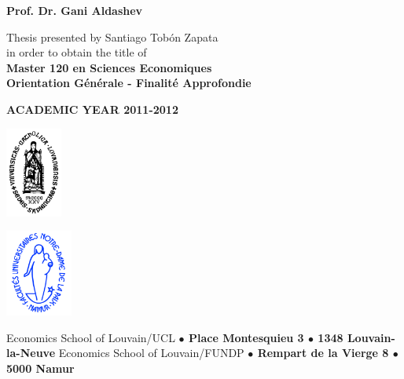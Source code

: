 \documentclass[a4paper, 12pt]{article}
\begin{document}
\begin{framed}
\hspace{4cm}
\textbf{Prof. Dr. Gani Aldashev}
\vspace{1cm}
\normalsize
\begin{center}
Thesis presented by Santiago Tob\'{o}n Zapata\\
in order to obtain the title of\\
\textbf{Master 120 en Sciences Economiques}\\
\textbf{Orientation G\'{e}n\'{e}rale - Finalit\'{e} Approfondie}
\end{center}
\vspace{1cm}
\begin{center}
\textbf{ACADEMIC YEAR 2011-2012}
\end{center}
\vspace{1cm}
\begin{minipage}[b]{0.5\linewidth}
\begin{flushright}
\includegraphics[width=1.85cm]{./Logo_UCL.pdf}
\end{flushright}
\end{minipage}
\begin{minipage}[b]{0.5\linewidth}
\begin{flushleft}
\includegraphics[width=2.2cm]{./Logo_FUNDP.pdf}
\end{flushleft}
\end{minipage}
\begin{center} \footnotesize
Economics School of Louvain/UCL \textbf{$\bullet$ Place Montesquieu 3 $\bullet$ 1348 Louvain-la-Neuve}
Economics School of Louvain/FUNDP \textbf{$\bullet$ Rempart de la Vierge 8 $\bullet$ 5000 Namur}
\end{center}
\end{framed}
\onehalfspacing

\newpage
\thispagestyle{empty}
\mbox{}
\end{document}
